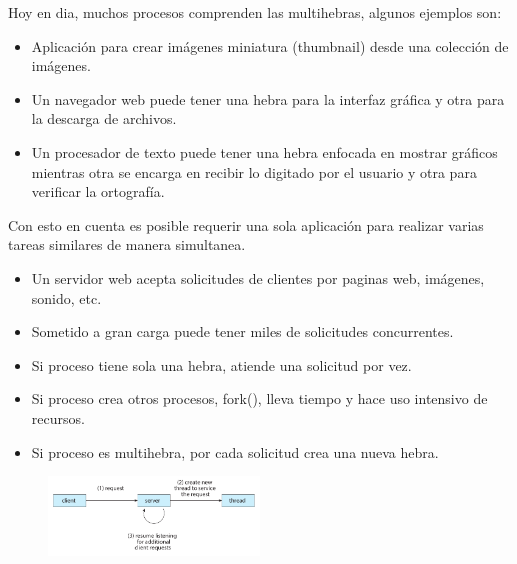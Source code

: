 \documentclass{templateNote}
\begin{document}
\noindent Hoy en dia, muchos procesos comprenden las multihebras, algunos ejemplos son:
\begin{itemize}
    \item Aplicación para crear imágenes miniatura (thumbnail) desde una colección de imágenes.
    \item Un navegador web puede tener una hebra para la interfaz gráfica y otra para la descarga de archivos.
    \item Un procesador de texto puede tener una hebra enfocada en mostrar gráficos mientras otra se encarga en recibir lo digitado por el usuario y otra para verificar la ortografía.
\end{itemize}
Con esto en cuenta es posible requerir una sola aplicación para realizar varias tareas similares de manera simultanea.
\begin{itemize}
    \item Un servidor web acepta solicitudes de clientes por paginas web, imágenes, sonido, etc.
    \item Sometido a gran carga puede tener miles de solicitudes concurrentes.
    \item Si proceso tiene sola una hebra, atiende una solicitud por vez.
    \item Si proceso crea otros procesos, fork(), lleva tiempo y hace uso intensivo de recursos.
    \item Si proceso es multihebra, por cada solicitud crea una nueva hebra.
\end{itemize}

\begin{figure}[H]
    \centering
    \includegraphics[width=0.5\textwidth]{img/ejemplohebra.png}
\end{figure}
\end{document}
